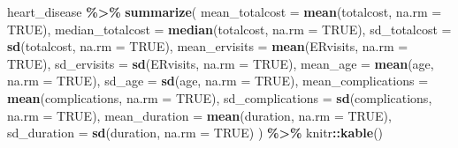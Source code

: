 \documentclass[
]{article}
\newenvironment{Shaded}{\begin{snugshade}}{\end{snugshade}}
\newcommand{\AttributeTok}[1]{\textcolor[rgb]{0.13,0.29,0.53}{#1}}
\newcommand{\ConstantTok}[1]{\textcolor[rgb]{0.56,0.35,0.01}{#1}}
\newcommand{\FunctionTok}[1]{\textcolor[rgb]{0.13,0.29,0.53}{\textbf{#1}}}
\newcommand{\NormalTok}[1]{#1}
\newcommand{\SpecialCharTok}[1]{\textcolor[rgb]{0.81,0.36,0.00}{\textbf{#1}}}
\begin{document}
\begin{Shaded}
\begin{Highlighting}[]
\NormalTok{heart\_disease }\SpecialCharTok{\%\textgreater{}\%} 
  \FunctionTok{summarize}\NormalTok{(}
    \AttributeTok{mean\_totalcost =} \FunctionTok{mean}\NormalTok{(totalcost, }\AttributeTok{na.rm =} \ConstantTok{TRUE}\NormalTok{),}
    \AttributeTok{median\_totalcost =} \FunctionTok{median}\NormalTok{(totalcost, }\AttributeTok{na.rm =} \ConstantTok{TRUE}\NormalTok{),}
    \AttributeTok{sd\_totalcost =} \FunctionTok{sd}\NormalTok{(totalcost, }\AttributeTok{na.rm =} \ConstantTok{TRUE}\NormalTok{),}
    \AttributeTok{mean\_ervisits =} \FunctionTok{mean}\NormalTok{(ERvisits, }\AttributeTok{na.rm =} \ConstantTok{TRUE}\NormalTok{),}
    \AttributeTok{sd\_ervisits =} \FunctionTok{sd}\NormalTok{(ERvisits, }\AttributeTok{na.rm =} \ConstantTok{TRUE}\NormalTok{),}
    \AttributeTok{mean\_age =} \FunctionTok{mean}\NormalTok{(age, }\AttributeTok{na.rm =} \ConstantTok{TRUE}\NormalTok{),}
    \AttributeTok{sd\_age =} \FunctionTok{sd}\NormalTok{(age, }\AttributeTok{na.rm =} \ConstantTok{TRUE}\NormalTok{),}
    \AttributeTok{mean\_complications =} \FunctionTok{mean}\NormalTok{(complications, }\AttributeTok{na.rm =} \ConstantTok{TRUE}\NormalTok{),}
    \AttributeTok{sd\_complications =} \FunctionTok{sd}\NormalTok{(complications, }\AttributeTok{na.rm =} \ConstantTok{TRUE}\NormalTok{),}
    \AttributeTok{mean\_duration =} \FunctionTok{mean}\NormalTok{(duration, }\AttributeTok{na.rm =} \ConstantTok{TRUE}\NormalTok{),}
    \AttributeTok{sd\_duration =} \FunctionTok{sd}\NormalTok{(duration, }\AttributeTok{na.rm =} \ConstantTok{TRUE}\NormalTok{)}
\NormalTok{  ) }\SpecialCharTok{\%\textgreater{}\%}\NormalTok{ knitr}\SpecialCharTok{::}\FunctionTok{kable}\NormalTok{()}
\end{Highlighting}
\end{Shaded}
\end{document}
